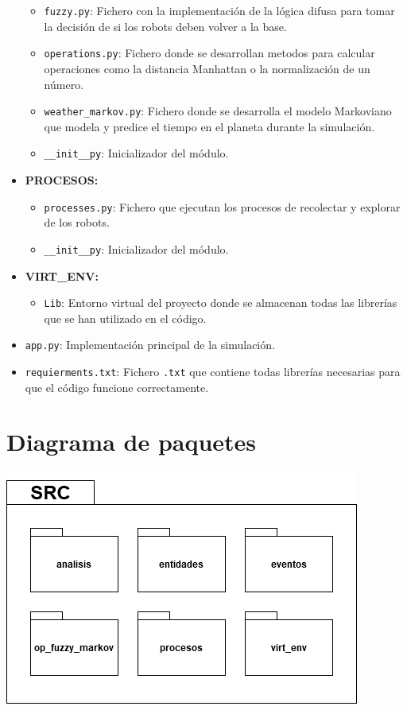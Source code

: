 \documentclass[a4paper,12pt]{article}
\begin{document}
\begin{itemize}[label=\textbullet]
\begin{itemize}[label=\textendash]
        \item \texttt{fuzzy.py}: Fichero con la implementación de la lógica difusa para tomar la decisión de si los robots deben volver a la base.
        \item \texttt{operations.py}: Fichero donde se desarrollan metodos para calcular operaciones como la distancia Manhattan o la normalización de un número.
        \item \texttt{weather\_markov.py}: Fichero donde se desarrolla el modelo Markoviano que modela y predice el tiempo en el planeta durante la simulación.
        \item \texttt{\_\_init\_\_py}: Inicializador del módulo.
    \end{itemize}
    \item \textbf{PROCESOS:}
    \begin{itemize}[label=\textendash]
        \item \texttt{processes.py}: Fichero que ejecutan los procesos de recolectar y explorar de los robots.
        \item \texttt{\_\_init\_\_py}: Inicializador del módulo.
    \end{itemize}
    \item \textbf{VIRT\_ENV:}
    \begin{itemize}[label=\textendash]
        \item \texttt{Lib}: Entorno virtual del proyecto donde se almacenan todas las librerías que se han utilizado en el código.
    \end{itemize}
    \item \texttt{app.py}: Implementación principal de la simulación.
    \item \texttt{requierments.txt}: Fichero \texttt{.txt} que contiene todas librerías necesarias para que el código funcione correctamente.
\end{itemize}

\section{Diagrama de paquetes}
    \includegraphics[scale=1]{images/diag_paquetes.png}
\end{document}
